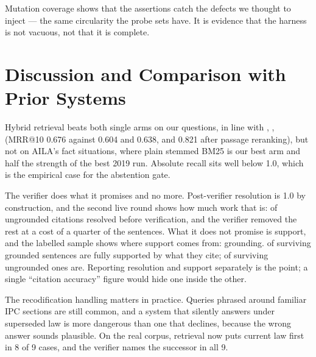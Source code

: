 \documentclass[conference]{IEEEtran}
\begin{document}
Mutation coverage shows that the assertions catch the defects we thought to inject --- the same circularity the probe sets have. It is evidence that the harness is not vacuous, not that it is complete.

\section{Discussion and Comparison with Prior Systems}

Hybrid retrieval beats both single arms on our questions, in line with \cite{bolla2026}, \cite{rustamov2025}, \cite{sun2025} (MRR@10 0.676 against 0.604 and 0.638, and 0.821 after passage reranking), but not on AILA's fact situations, where plain stemmed BM25 is our best arm and half the strength of the best 2019 run. Absolute recall sits well below 1.0, which is the empirical case for the abstention gate.

The verifier does what it promises and no more. Post-verifier resolution is 1.0 by construction, and the second live round shows how much work that is: \RtwoUngroundedPre{} of ungrounded citations resolved before verification, and the verifier removed the rest at a cost of a quarter of the sentences. What it does not promise is support, and the labelled sample shows where support comes from: grounding. \SupGroundedPrec{} of surviving grounded sentences are fully supported by what they cite; \SupUngroundedPrec{} of surviving ungrounded ones are. Reporting resolution and support separately is the point; a single ``citation accuracy'' figure would hide one inside the other.

The recodification handling matters in practice. Queries phrased around familiar IPC sections are still common, and a system that silently answers under superseded law is more dangerous than one that declines, because the wrong answer sounds plausible. On the real corpus, retrieval now puts current law first in 8 of 9 cases, and the verifier names the successor in all 9.
\end{document}
